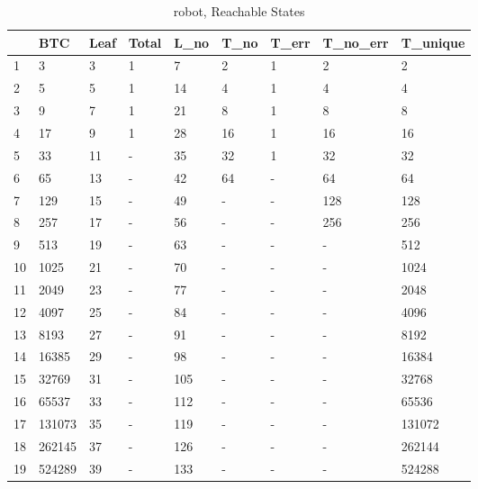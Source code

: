 \begin{table}
\centering
\caption{robot, Reachable States}
\label{robot_reach}
\begin{tabular}{lllllllll}
\toprule
{} &          BTC & Leaf & Total & L\_no & T\_no & T\_err & T\_no\_err &     T\_unique \\
\midrule
1  &            3 &    3 &     1 &    7 &    2 &     1 &        2 &            2 \\
2  &            5 &    5 &     1 &   14 &    4 &     1 &        4 &            4 \\
3  &            9 &    7 &     1 &   21 &    8 &     1 &        8 &            8 \\
4  &           17 &    9 &     1 &   28 &   16 &     1 &       16 &           16 \\
5  &           33 &   11 &     - &   35 &   32 &     1 &       32 &           32 \\
6  &           65 &   13 &     - &   42 &   64 &     - &       64 &           64 \\
7  &          129 &   15 &     - &   49 &    - &     - &      128 &          128 \\
8  &          257 &   17 &     - &   56 &    - &     - &      256 &          256 \\
9  &          513 &   19 &     - &   63 &    - &     - &        - &          512 \\
10 &         1025 &   21 &     - &   70 &    - &     - &        - &         1024 \\
11 &         2049 &   23 &     - &   77 &    - &     - &        - &         2048 \\
12 &         4097 &   25 &     - &   84 &    - &     - &        - &         4096 \\
13 &         8193 &   27 &     - &   91 &    - &     - &        - &         8192 \\
14 &        16385 &   29 &     - &   98 &    - &     - &        - &        16384 \\
15 &        32769 &   31 &     - &  105 &    - &     - &        - &        32768 \\
16 &        65537 &   33 &     - &  112 &    - &     - &        - &        65536 \\
17 &       131073 &   35 &     - &  119 &    - &     - &        - &       131072 \\
18 &       262145 &   37 &     - &  126 &    - &     - &        - &       262144 \\
19 &       524289 &   39 &     - &  133 &    - &     - &        - &       524288 \\

\end{tabular}
\end{table}
